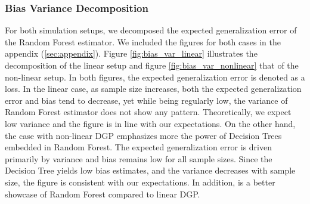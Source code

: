 \subsubsection{Bias Variance Decomposition}
For both simulation setups, we decomposed the 
expected generalization error of the
Random Forest estimator. We included the figures for both 
cases in the appendix (\ref{sec:appendix}). 
Figure \ref{fig:bias_var_linear} illustrates the decomposition of the
linear setup and 
figure \ref{fig:bias_var_nonlinear} that of the non-linear setup. 
In both figures, the expected generalization error 
is denoted as a loss. 
In the linear case, as sample size increases, both 
the expected generalization error and bias tend to decrease, 
yet while being regularly low, the variance of 
Random Forest estimator does not show any pattern. 
Theoretically, we expect low variance and 
the figure is in line with our expectations.
On the other hand, the case with non-linear DGP emphasizes 
more the power of Decision Trees embedded in Random Forest. 
The expected generalization error is driven primarily 
by variance and bias remains low for all sample sizes. 
Since the Decision Tree yields low bias estimates, and 
the variance decreases with sample size, the
figure is consistent with our expectations.
In addition, is a better showcase of Random Forest compared to linear DGP.